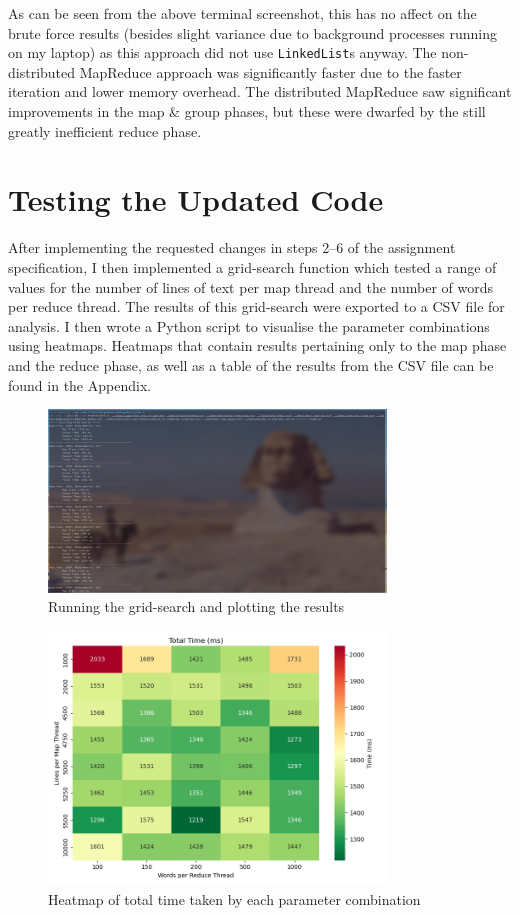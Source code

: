 \documentclass[a4paper]{article}
\begin{document}
As can be seen from the above terminal screenshot, this has no affect on the brute force results (besides slight variance due to background processes running on my laptop) as this approach did not use \texttt{LinkedList}s anyway.
The non-distributed MapReduce approach was significantly faster due to the faster iteration and lower memory overhead.
The distributed MapReduce saw significant improvements in the map \& group phases, but these were dwarfed by the still greatly inefficient reduce phase.

\section{Testing the Updated Code}
After implementing the requested changes in steps 2--6 of the assignment specification, I then implemented a grid-search function which tested a range of values for the number of lines of text per map thread and the number of words per reduce thread.
The results of this grid-search were exported to a CSV file for analysis.
I then wrote a Python script to visualise the parameter combinations using heatmaps.
Heatmaps that contain results pertaining only to the map phase and the reduce phase, as well as a table of the results from the CSV file can be found in the Appendix. 

\begin{figure}[H]
    \centering
    \includegraphics[width=0.8\textwidth]{./images/gridsearch.png}
    \caption{Running the grid-search and plotting the results}
\end{figure}

\begin{figure}[H]
    \centering
    \includegraphics[width=0.8\textwidth]{./images/total_time_heatmap.png}
    \caption{Heatmap of total time taken by each parameter combination}
\end{figure}
\end{document}
